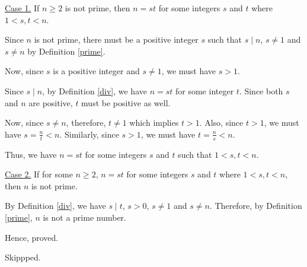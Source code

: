 \begin{solution}
	\underline{Case 1.} If $n \geq 2$ is not prime, then $n = st$ for some integers $s$ and $t$ where $1 < s, t < n$.
	
	Since $n$ is not prime, there must be a positive integer $s$ such that $s \mid n$, $s \neq 1$ and $s \neq n$ by Definition \ref{prime}.

	Now, since $s$ is a positive integer and $s \neq 1$, we must have $s > 1$.

	Since $s \mid n$, by Definition \ref{div}, we have $n = st$ for some integer $t$. Since both $s$ and $n$ are positive, $t$ must be positive as well.

	Now, since $s \neq n$, therefore, $t \neq 1$ which implies $t > 1$. Also, since $t > 1$, we must have $s = \frac{n}{t} < n$. 
	Similarly, since $s > 1$, we must have $t = \frac{n}{s} < n$. 

	Thus, we have $n = st$ for some integers $s$ and $t$ such that $1 < s,t < n$.

	\underline{Case 2.} If for some $n \geq 2$, $n = st$ for some integers $s$ and $t$ where $1 < s, t < n$, then $n$ is not prime.

	By Definition \ref{div}, we have $s \mid t$, $s > 0$, $s \neq 1$ and $s \neq n$. Therefore, by Definition \ref{prime}, $n$ is not a prime number.


	Hence, proved.
\end{solution}

\begin{problem}Skippped.\end{problem}
